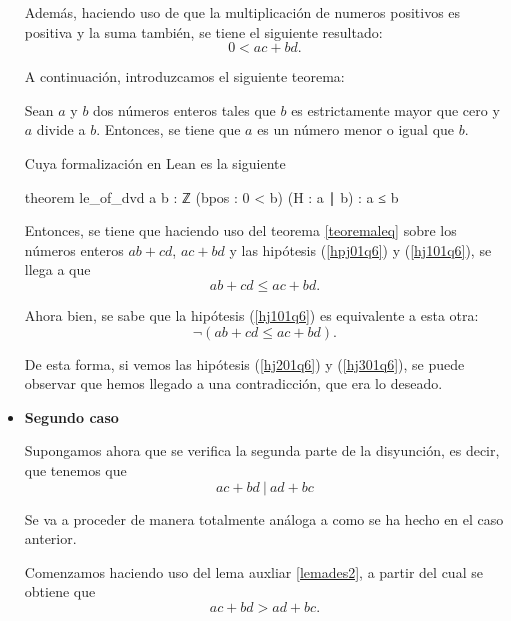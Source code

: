 \begin{demostracion}
\begin{itemize}
    Además, haciendo uso de que la multiplicación de numeros positivos es
    positiva y la suma también, se tiene el siguiente resultado:
    \begin{equation}\label{hpj01q6}\tag{hpj}
      0 < ac+bd.
    \end{equation}

    A continuación, introduzcamos el siguiente teorema:
    \begin{teorema}\label{teoremaleq}
      Sean \(a\) y \(b\) dos números enteros tales que \(b\) es
      estrictamente mayor que cero y \(a\) divide a \(b\). Entonces, se
      tiene que \(a\) es un número menor o igual que
      \(b\).
    \end{teorema}

    Cuya formalización en Lean es la siguiente
    \begin{leancode}
    theorem le_of_dvd {a b : ℤ}
    (bpos : 0 < b)
    (H : a ∣ b) :
    a ≤ b
    \end{leancode}

    Entonces, se tiene que haciendo uso del teorema \ref{teoremaleq} sobre
    los números enteros \(ab+cd\), \(ac+bd\) y las hipótesis (\ref{hpj01q6})
    y (\ref{hj101q6}), se llega a que
    \begin{equation}\tag{hj2}\label{hj201q6}
      ab+cd≤ac+bd.
    \end{equation}

    Ahora bien, se sabe que la hipótesis (\ref{hj101q6}) es equivalente a
    esta otra:
    \begin{equation}\tag{hj3}\label{hj301q6}
      ¬(ab+cd≤ac+bd).
    \end{equation}

    De esta forma, si vemos las hipótesis (\ref{hj201q6}) y (\ref{hj301q6}),
    se puede observar que hemos llegado a una contradicción, que era lo
    deseado.

  \item \textbf{Segundo caso}

    Supongamos ahora que se verifica la segunda parte de la disyunción, es
    decir, que tenemos que
    \begin{equation}\tag{hk}\label{hk01q6teor}
      ac+bd\ |\ ad+bc
    \end{equation}

    Se va a proceder de manera totalmente análoga a como se ha hecho en el
    caso anterior.

    Comenzamos haciendo uso del lema auxliar \ref{lemades2}, a partir del
    cual se obtiene que
     \begin{equation}\tag{hk1}\label{hk101q6}
      ac+bd > ad+bc.
    \end{equation}


\end{itemize}
\end{demostracion}
